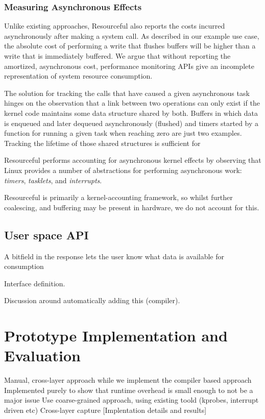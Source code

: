 \documentclass[letterpaper,twocolumn,10pt]{article}
\newcommand{\pname}{Resourceful}
\begin{document}
\subsubsection{Measuring Asynchronous Effects}
Unlike existing approaches, \pname{} also reports the costs incurred
asynchronously after making a system call. As described in our example
use case, the absolute cost of performing a write that flushes buffers will be
higher than a write that is immediately buffered. We argue that without
reporting the amortized, asynchronous cost, performance monitoring APIs give an
incomplete representation of system resource consumption.

The solution for tracking the calls that have caused a given asynchronous task
hinges on the observation that a link between two operations can only
exist if the kernel code maintains some data structure shared by both. Buffers
in which data is enqueued and later dequeued asynchronously (flushed) and timers
started by a function for running a given task when reaching zero are
just two examples. Tracking the lifetime of those shared structures is sufficient for 


\pname{ } performs accounting for asynchronous kernel effects by observing that
Linux provides a number of abstractions for performing asynchronous work:
\emph{timers}, \emph{tasklets}, and \emph{interrupts}.

\pname{ } is primarily a kernel-accounting framework, so whilst further
coalescing, and buffering may be present in hardware, we do not account for
this.


\subsection{User space API} 
A bitfield in the response lets the user know what data is available for consumption

Interface definition.

Discussion around automatically adding this (compiler).

\section{Prototype Implementation and Evaluation} Manual, cross-layer approach
while we implement the compiler based approach Implemented purely to show that
runtime overhead is small enough to not be a major issue Use coarse-grained
approach, using existing toold (kprobes, interrupt driven etc) Cross-layer
capture [Implentation details and results]
\end{document}
